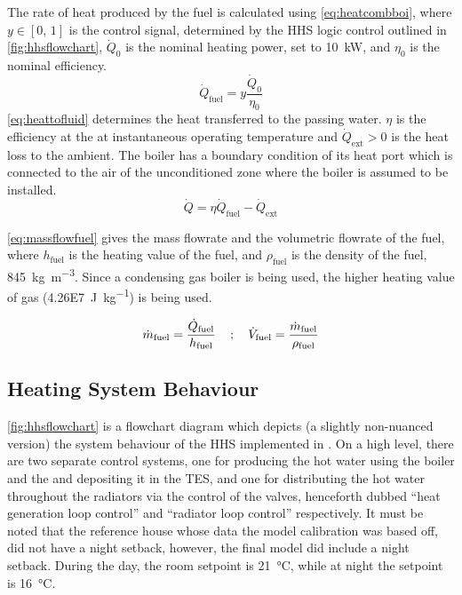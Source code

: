 The rate of heat produced by the fuel is calculated using \cref{eq:heatcombboi}, where $y \in [0\text{, }1]$ is the control signal, determined by the \ac{HHS} logic control outlined in \cref{fig:hhsflowchart}, $\dot{Q}_0$ is the nominal heating power, set to \qty{10}{\kilo\watt}, and $\eta_0$ is the nominal efficiency.
\begin{equation}
    \dot{Q}_\text{fuel} = y \frac{\dot{Q}_0}{\eta_0}\label{eq:heatcombboi}
\end{equation}
\cref{eq:heattofluid} determines the heat transferred to the passing water. $\eta$ is the efficiency at the at instantaneous operating temperature and $\dot{Q}_\text{ext} > 0 $ is the heat loss to the ambient. The boiler has a boundary condition of its heat port which is connected to the air of the unconditioned zone where the boiler is assumed to be installed.  
\begin{equation}
    \dot{Q} = \eta \dot{Q}_\text{fuel} - \dot{Q}_\text{ext}\label{eq:heattofluid}
\end{equation}

\cref{eq:massflowfuel} gives the mass flowrate and the volumetric flowrate of the fuel, where $h_\text{fuel}$ is the heating value of the fuel, and $\rho_\text{fuel}$ is the density of the fuel, \qty{845}{\kilo\gram\per\cubic\meter}. Since a condensing gas boiler is being used, the higher heating value of gas (\qty{4.26E7}{\joule\per\kilo\gram}) is being used.

 \begin{equation}
    \dot{m}_\text{fuel} =\frac{\dot{Q}_\text{fuel}}{h_\text{fuel}}\label{eq:massflowfuel}\text{\;\;\; ; \;\;\;} \dot{V}_\text{fuel} =\frac{\dot{m}_\text{fuel}}{\rho_\text{fuel}}
 \end{equation}


\subsection{Heating System Behaviour}
\cref{fig:hhsflowchart} is a flowchart diagram which depicts (a slightly non-nuanced version) the system behaviour of the \ac{HHS} implemented in \modelica. 
On a high level, there are two separate control systems, one for producing the hot water using the boiler and the \HP and depositing it in the \ac{TES}, and one for distributing the hot water throughout the radiators via the control of the valves, henceforth dubbed ``heat generation loop control'' and ``radiator loop control'' respectively. It must be noted that the reference house whose data the model  calibration was based off, did not have a night setback, however, the final model did include a night setback. During the day, the room setpoint is \qty{21}{\celsius}, while at night the setpoint is \qty{16}{\celsius}.

